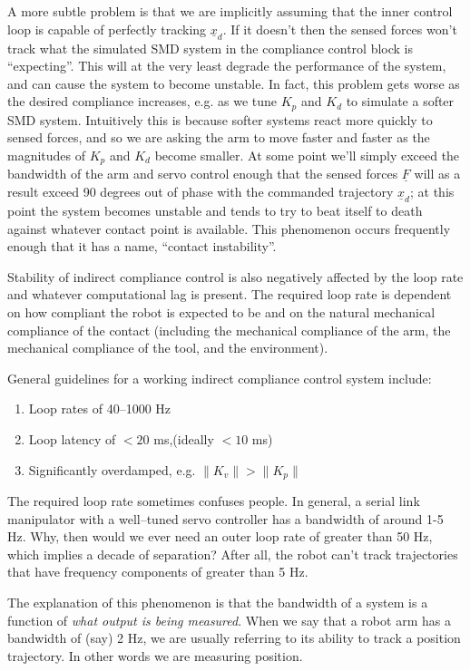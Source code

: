 \documentclass[]{article}
\begin{document}
A more subtle problem is that we are implicitly assuming that the inner control loop is capable of perfectly tracking $\underline{x}_{d}$. If it doesn't then the sensed forces won't track what the simulated SMD system in the compliance control block is ``expecting''. This will at the very least degrade the performance of the system, and can cause the system to become unstable. In fact, this problem gets worse as the desired compliance increases, e.g. as we tune $K_{p}$ and $K_{d}$ to simulate a softer SMD system. Intuitively this is because softer systems react more quickly to sensed forces, and so we are asking the arm to move faster and faster as the magnitudes of $K_{p}$ and $K_{d}$ become smaller. At some point we'll simply exceed the bandwidth of the arm and servo control enough that the sensed forces $\underline{F}$ will as a result exceed 90 degrees out of phase with the commanded trajectory $\underline{x}_{d}$; at this point the system becomes unstable and tends to try to beat itself to death against whatever contact point is available. This phenomenon occurs frequently enough that it has a name, ``contact instability''.

Stability of indirect compliance control is also negatively affected by the loop rate and whatever computational lag is present. The required loop rate is dependent on how compliant the robot is expected to be and on the natural mechanical compliance of the contact (including the mechanical compliance of the arm, the mechanical compliance of the tool, and the environment).

General guidelines for a working indirect compliance control system include:\begin{enumerate}
    \item Loop rates of 40--1000 Hz
    \item Loop latency of $< 20$ ms,(ideally $< 10$ ms)
    \item Significantly overdamped, e.g. $\|K_{v}\| > \|K_{p}\|$
\end{enumerate}

The required loop rate sometimes confuses people. In general, a serial link manipulator with a well--tuned servo controller has a bandwidth of around 1-5 Hz. Why, then would we ever need an outer loop rate of greater than 50 Hz, which implies a decade of separation? After all, the robot can't track trajectories that have frequency components of greater than 5 Hz.

The explanation of this phenomenon is that the bandwidth of a system is a function of \textit{what output is being measured}. When we say that a robot arm has a bandwidth of (say) 2 Hz, we are usually referring to its ability to track a position trajectory. In other words we are measuring position.
\end{document}
